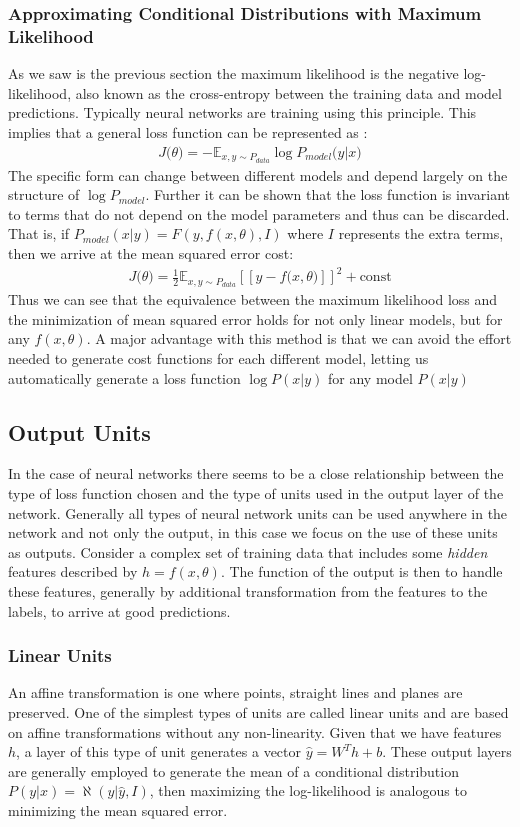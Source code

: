 \documentclass[14pt]{extarticle}
\numberwithin{equation}{section}
\begin{document}
	\subsubsection{Approximating Conditional Distributions with Maximum Likelihood}
	As we saw is the previous section the maximum likelihood is the negative log-likelihood, also known as the cross-entropy between the training data and model predictions. Typically neural networks are training using this principle. This implies that a general loss function can be represented as :
	\begin{align}
	J\big(\theta\big) = -\mathbb{E}_{x,{y \sim P_{data}}}\log P_{model}\big(y|x\big)
	\end{align}
	The specific form can change between different models and depend largely on the structure of $\log P_{model}$. Further it can be shown that the loss function is invariant to terms that do not depend on the model parameters and thus can be discarded. That is, if $P_{model}(x | y) = F(y, f(x,\theta), I)$ where $I$ represents the extra terms, then we arrive at the mean squared error cost:
	\begin{align}
	J\big(\theta\big) = \frac{1}{2} \mathbb{E}_{x,{y \sim P_{data}}} [\![y - f\big(x, \theta\big)]\!]^2 + \text{const} \label{eq:mse_loss}
	\end{align}
	Thus we can see that the equivalence between the maximum likelihood loss and the minimization of mean squared error holds for not only linear models, but for any $f(x,\theta)$. A major advantage with this method is that we can avoid the effort needed to generate cost functions for each different model, letting us automatically generate a loss function $\log P(x | y)$ for any model $P(x | y)$
	\subsection{Output Units}
	In the case of neural networks there seems to be a close relationship between the type of loss function chosen and the type of units used in the output layer of the network. Generally all types of neural network units can be used anywhere in the network and not only the output, in this case we focus on the use of these units as outputs. Consider a complex set of training data that includes some \textit{hidden} features described by $h = f(x,\theta)$. The function of the output is then to handle these features, generally by additional transformation from the features to the labels, to arrive at good predictions.
	\subsubsection{Linear Units}\label{linear_unit}
	An affine transformation is one where points, straight lines and planes are preserved. One of the simplest types of units are called linear units and are based on affine transformations without any non-linearity. Given that we have features $h$, a layer of this type of unit generates a vector $\hat{y} = W^T h + b$. These output layers are generally employed to generate the mean of a conditional distribution $P(y | x) = \aleph(y | \hat{y}, I)$, then maximizing the log-likelihood is analogous to minimizing the mean squared error.
\end{document}
